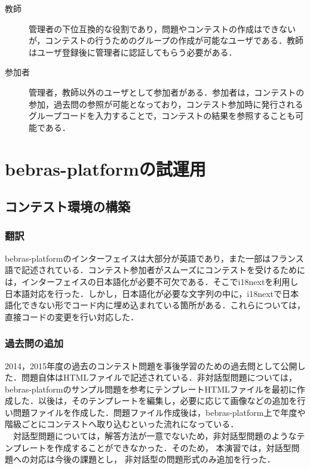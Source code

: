\documentclass[a4paper]{jarticle}
\begin{document}
\begin{multicols}{2}
\begin{description}
\item[教師] 管理者の下位互換的な役割であり，問題やコンテストの作成はできないが，コンテストの行うためのグループの作成が可能なユーザである．教師はユーザ登録後に管理者に認証してもらう必要がある．
\end{description}

\begin{description}
\item[参加者] 管理者，教師以外のユーザとして参加者がある．参加者は，コンテストの参加，過去問の参照が可能となっており，コンテスト参加時に発行されるグループコードを入力することで，コンテストの結果を参照することも可能である．
\end{description}




\section{bebras-platformの試運用}
\subsection{コンテスト環境の構築}
\subsubsection{翻訳}
bebras-platformのインターフェイスは大部分が英語であり，また一部はフランス語で記述されている．コンテスト参加者がスムーズにコンテストを受けるためには，インターフェイスの日本語化が必要不可欠である．そこでi18nextを利用し日本語対応を行った．しかし，日本語化が必要な文字列の中に，i18nextで日本語化できない形でコード内に埋め込まれている箇所がある．これらについては，直接コードの変更を行い対応した．

\subsubsection{過去問の追加}
2014，2015年度の過去のコンテスト問題を事後学習のための過去問として公開した．問題自体はHTMLファイルで記述されている．非対話型問題については，bebras-platformのサンプル問題を参考にテンプレートHTMLファイルを最初に作成した．以後は，そのテンプレートを編集し，必要に応じて画像などの追加を行い問題ファイルを作成した．問題ファイル作成後は，bebras-platform上で年度や階級ごとにコンテストへ取り込むといった流れになっている．
\\　対話型問題については，解答方法が一意でないため，非対話型問題のようなテンプレートを作成することができなかった．そのため，
本演習では，対話型問題への対応は今後の課題とし，
非対話型の問題形式のみ追加を行った．


\end{multicols}
\end{document}

